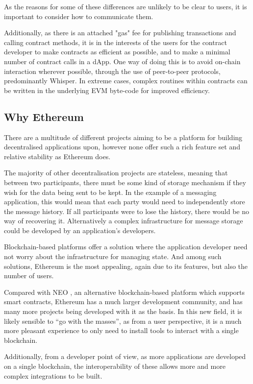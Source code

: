 As the reasons for some of these differences are unlikely to be clear to users, it is important to consider how to communicate them.

Additionally, as there is an attached "gas" fee for publishing transactions and calling contract methods, it is in the interests of the users for the contract developer to make contracts as efficient as possible, and to make a minimal number of contract calls in a dApp. One way of doing this is to avoid on-chain interaction wherever possible, through the use of peer-to-peer protocols, predominantly Whisper. In extreme cases, complex routines within contracts can be written in the underlying EVM byte-code for improved efficiency.

\subsection{Why Ethereum}

There are a multitude of different projects aiming to be a platform for building decentralised applications upon, however none offer such a rich feature set and relative stability as Ethereum does.

The majority of other decentralisation projects are stateless, meaning that between two participants, there must be some kind of storage mechanism if they wish for the data being sent to be kept. In the example of a messaging application, this would mean that each party would need to independently store the message history. If all participants were to lose the history, there would be no way of recovering it. Alternatively a complex infrastructure for message storage could be developed by an application's developers.

Blockchain-based platforms offer a solution where the application developer need not worry about the infrastructure for managing state. And among such solutions, Ethereum is the most appealing, again due to its features, but also the number of users.

Compared with NEO \cite{NEO}, an alternative blockchain-based platform which supports smart contracts, Ethereum has a much larger development community, and has many more projects being developed with it as the basis. In this new field, it is likely sensible to \enquote{go with the masses}, as from a user perspective, it is a much more pleasant experience to only need to install tools to interact with a single blockchain.

Additionally, from a developer point of view, as more applications are developed on a single blockchain, the interoperability of these allows more and more complex integrations to be built.
